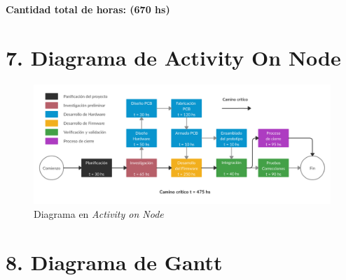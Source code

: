 \documentclass[11pt]{charter}
\begin{document}
\textbf{Cantidad total de horas: (670 hs)}

\vspace{10mm}
\section{7. Diagrama de Activity On Node}
\label{sec:AoN}





\begin{figure}[htpb]
\centering 
\includegraphics[width=1\textwidth]{./Figuras/AoN_Cargador.png}
\caption{Diagrama en \textit{Activity on Node}}
\label{fig:AoN}
\end{figure}




\section{8. Diagrama de Gantt}
\label{sec:gantt}
\end{document}
